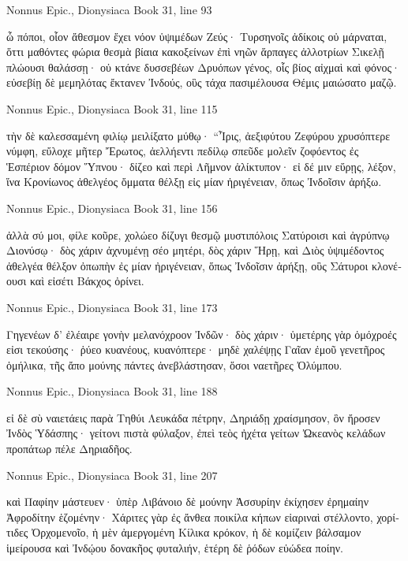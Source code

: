 \documentclass[12pt,letterpaper,twoside,final]{memoir}
\begin{document}
\begin{greek}
Nonnus Epic., Dionysiaca 
Book 31, line 93

ὦ πόποι, οἷον ἄθεσμον ἔχει νόον ὑψιμέδων Ζεύς· 
Τυρσηνοῖς ἀδίκοις οὐ μάρναται, ὅττι μαθόντες 
φώρια θεσμὰ βίαια κακοξείνων ἐπὶ νηῶν 
ἅρπαγες ἀλλοτρίων Σικελῇ πλώουσι θαλάσσῃ· 
οὐ κτάνε δυσσεβέων Δρυόπων γένος, οἷς βίος αἰχμαὶ 
καὶ φόνος· εὐσεβίῃ δὲ μεμηλότας ἔκτανεν Ἰνδούς, 
οὓς τάχα πασιμέλουσα Θέμις μαιώσατο μαζῷ. 



Nonnus Epic., Dionysiaca 
Book 31, line 115

τὴν δὲ καλεσσαμένη φιλίῳ μειλίξατο μύθῳ·   
 “Ἶρις, ἀεξιφύτου Ζεφύρου χρυσόπτερε νύμφη, 
εὔλοχε μῆτερ Ἔρωτος, ἀελλήεντι πεδίλῳ 
σπεῦδε μολεῖν ζοφόεντος ἐς Ἑσπέριον δόμον Ὕπνου· 
δίζεο καὶ περὶ Λῆμνον ἁλίκτυπον· εἰ δέ μιν εὕρῃς, 
λέξον, ἵνα Κρονίωνος ἀθελγέος ὄμματα θέλξῃ 
εἰς μίαν ἠριγένειαν, ὅπως Ἰνδοῖσιν ἀρήξω. 



Nonnus Epic., Dionysiaca 
Book 31, line 156

ἀλλὰ σύ μοι, φίλε κοῦρε, χολώεο δίζυγι θεσμῷ 
μυστιπόλοις Σατύροισι καὶ ἀγρύπνῳ Διονύσῳ· 
δὸς χάριν ἀχνυμένῃ σέο μητέρι, δὸς χάριν Ἥρῃ, 
καὶ Διὸς ὑψιμέδοντος ἀθελγέα θέλξον ὀπωπὴν 
ἐς μίαν ἠριγένειαν, ὅπως Ἰνδοῖσιν ἀρήξῃ, 
οὓς Σάτυροι κλονέουσι καὶ εἰσέτι Βάκχος ὀρίνει. 



Nonnus Epic., Dionysiaca 
Book 31, line 173

Γηγενέων δ' ἐλέαιρε γονὴν μελανόχροον Ἰνδῶν· 
δὸς χάριν· ὑμετέρης γὰρ ὁμόχροές εἰσι τεκούσης· 
ῥύεο κυανέους, κυανόπτερε· μηδὲ χαλέψῃς 
Γαῖαν ἐμοῦ γενετῆρος ὁμήλικα, τῆς ἄπο μούνης 
πάντες ἀνεβλάστησαν, ὅσοι ναετῆρες Ὀλύμπου. 



Nonnus Epic., Dionysiaca 
Book 31, line 188

εἰ δὲ σὺ ναιετάεις παρὰ Τηθύι Λευκάδα πέτρην, 
Δηριάδῃ χραίσμησον, ὃν ἤροσεν Ἰνδὸς Ὑδάσπης· 
γείτονι πιστὰ φύλαξον, ἐπεὶ τεὸς ἠχέτα γείτων 
Ὠκεανὸς κελάδων προπάτωρ πέλε Δηριαδῆος. 



Nonnus Epic., Dionysiaca 
Book 31, line 207

καὶ Παφίην μάστευεν· ὑπὲρ Λιβάνοιο δὲ μούνην 
Ἀσσυρίην ἐκίχησεν ἐρημαίην Ἀφροδίτην 
ἑζομένην· Χάριτες γὰρ ἐς ἄνθεα ποικίλα κήπων 
εἰαριναὶ στέλλοντο, χορίτιδες Ὀρχομενοῖο,   
ἡ μὲν ἀμεργομένη Κίλικα κρόκον, ἡ δὲ κομίζειν 
βάλσαμον ἱμείρουσα καὶ Ἰνδῴου δονακῆος 
φυταλιήν, ἑτέρη δὲ ῥόδων εὐώδεα ποίην. 




\end{greek}
\end{document}
